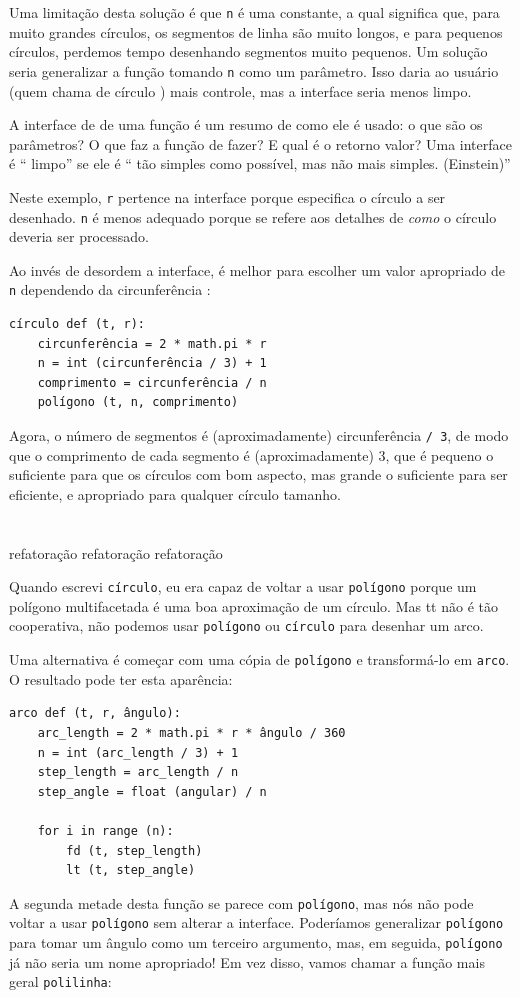 \documentclass[10pt]{book}
\begin{document}
Uma limitação desta solução é que {\tt n} é uma constante, a qual
significa que, para muito grandes círculos, os segmentos de linha são muito longos, e
para pequenos círculos, perdemos tempo desenhando segmentos muito pequenos. Um
solução seria generalizar a função tomando {\tt n} como
um parâmetro. Isso daria ao usuário (quem chama de círculo {\tt})
mais controle, mas a interface seria menos limpo.

A interface de {\bf} de uma função é um resumo de como ele é usado: o que
são os parâmetros? O que faz a função de fazer? E qual é o retorno
valor? Uma interface é `` limpo'' se ele é `` tão simples como
possível, mas não mais simples. (Einstein)''

Neste exemplo, {\tt r} pertence na interface porque
especifica o círculo a ser desenhado. {\tt n} é menos adequado
porque se refere aos detalhes de {\em como} o círculo deveria
ser processado.

Ao invés de desordem a interface, é melhor
para escolher um valor apropriado de {\tt n}
dependendo da circunferência {\tt}:

\begin{verbatim}
círculo def (t, r):
    circunferência = 2 * math.pi * r
    n = int (circunferência / 3) + 1
    comprimento = circunferência / n
    polígono (t, n, comprimento)
\end{verbatim}
%
Agora, o número de segmentos é (aproximadamente) {circunferência \tt / 3},
de modo que o comprimento de cada segmento é (aproximadamente) 3, que é pequeno
o suficiente para que os círculos com bom aspecto, mas grande o suficiente para ser eficiente,
e apropriado para qualquer círculo tamanho.


\section{} refatoração
\label{} refatoração
\index{} refatoração

Quando escrevi {\tt círculo}, eu era capaz de voltar a usar {\tt polígono}
porque um polígono multifacetada é uma boa aproximação de um círculo.
Mas {\arc tt} não é tão cooperativa, não podemos usar {\tt polígono}
ou {\tt círculo} para desenhar um arco.

Uma alternativa é começar com uma cópia
de {\tt polígono} e transformá-lo em {\tt arco}. O resultado
pode ter esta aparência:

\begin{verbatim}
arco def (t, r, ângulo):
    arc_length = 2 * math.pi * r * ângulo / 360
    n = int (arc_length / 3) + 1
    step_length = arc_length / n
    step_angle = float (angular) / n
    
    for i in range (n):
        fd (t, step_length)
        lt (t, step_angle)
\end{verbatim}
%
A segunda metade desta função se parece com {\tt polígono}, mas nós
não pode voltar a usar {\tt polígono} sem alterar a interface. Poderíamos
generalizar {\tt polígono} para tomar um ângulo como um terceiro argumento,
mas, em seguida, {\tt polígono} já não seria um nome apropriado!
Em vez disso, vamos chamar a função mais geral {\tt polilinha}:
\end{document}
